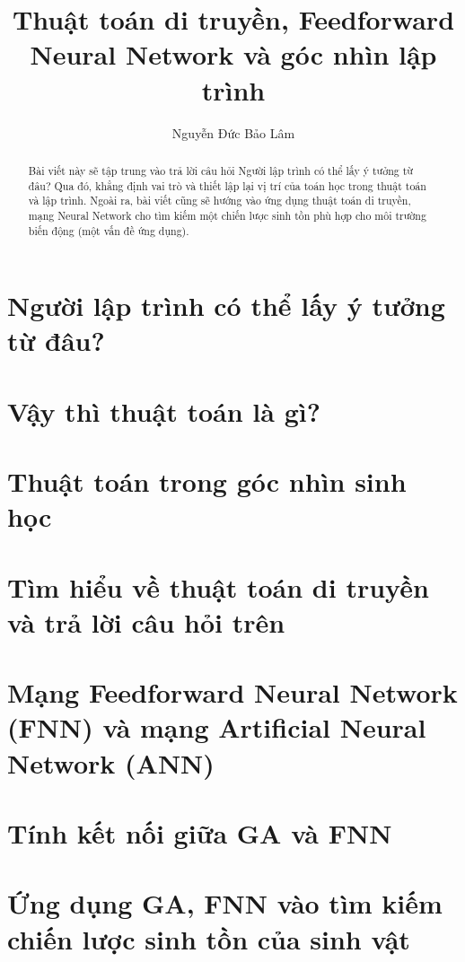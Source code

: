 \documentclass[12pt]{article}
\title{Thuật toán di truyền, Feedforward Neural Network và góc nhìn lập trình}
\author{Nguyễn Đức Bảo Lâm}
\begin{document}
\maketitle 

\tableofcontents
\pagebreak

\begin{abstract}
	Bài viết này sẽ tập trung vào trả lời câu hỏi \hypertarget{main_question}{Người lập trình có thể lấy ý tưởng từ đâu?} Qua đó, khẳng định vai trò và thiết lập lại vị trí của toán học trong thuật toán và lập trình. Ngoài ra, bài viết cũng sẽ hướng vào ứng dụng thuật toán di truyền, mạng Neural Network cho tìm kiếm một chiến lược sinh tồn phù hợp cho môi trường biến động (một vấn đề ứng dụng).
\end{abstract}

\section{Người lập trình có thể lấy ý tưởng từ đâu?}


\section{Vậy thì thuật toán là gì?}
\label{sec:algorithm}


\section{Thuật toán trong góc nhìn sinh học}


\section{Tìm hiểu về thuật toán di truyền và trả lời câu hỏi trên}


\section{Mạng Feedforward Neural Network (FNN) và mạng Artificial Neural Network (ANN)}


\section{Tính kết nối giữa GA và FNN}


\section{Ứng dụng GA, FNN vào tìm kiếm chiến lược sinh tồn của sinh vật}

 	
\end{document}
